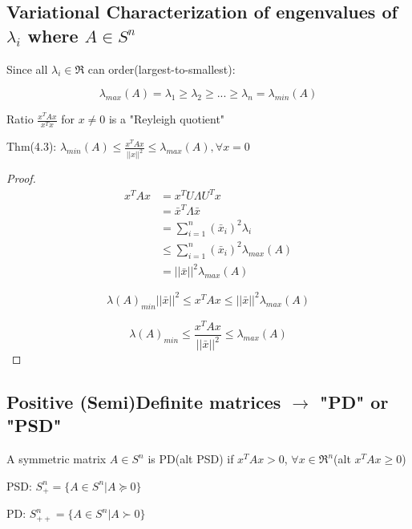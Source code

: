 \subsection{Variational Characterization of engenvalues of $\lambda_i$ where $A\in S^n$} 

Since all $\lambda_i \in \Re$ can order(largest-to-smallest):

\begin{equation*}
\lambda_{max}(A) = \lambda_1 \geq \lambda_2 \geq ... \geq \lambda_n =\lambda_{min}(A)
\end{equation*}

Ratio $\frac{x^TAx}{x^Tx}$ for $x\neq 0$ is a "Reyleigh quotient"

Thm(4.3): $\lambda_{min}(A) \leq \frac{x^TAx}{||x||^2}\leq \lambda_{max}(A), \forall x = 0$


\begin{proof}
	\begin{align*}
	x^TAx &= x^TU\Lambda U^Tx\\
	&= \bar{x}^T\Lambda\bar{x}\\
	&= \sum^n_{i=1}(\bar{x}_i)^2\lambda_i\\
	&\leq \sum^n_{i=1}(\bar{x}_i)^2\lambda_{max}(A)\\
	&= ||\bar{x}||^2\lambda_{max}(A)
	\end{align*}
	
	\begin{equation*}
	\lambda(A)_{min}||\bar{x}||^2 \leq x^TAx \leq ||\bar{x}||^2\lambda_{max}(A)
	\end{equation*}
	
	\begin{equation*}
	\lambda(A)_{min} \leq \frac{x^TAx}{||\bar{x}||^2} \leq \lambda_{max}(A)
	\end{equation*}
\end{proof}


\subsection{Positive (Semi)Definite matrices $\rightarrow$ "PD" or "PSD"}

\begin{definition}
	A symmetric matrix $A\in S^n$ is PD(alt PSD) if $x^TAx > 0$, $\forall x\in \Re^n$(alt $x^TAx\geq 0$)
\end{definition}

PSD: $S^n_{+} = \{A\in S^n | A\succeq 0\}$

PD: $S^n_{++} = \{A\in S^n | A\succ 0\}$

